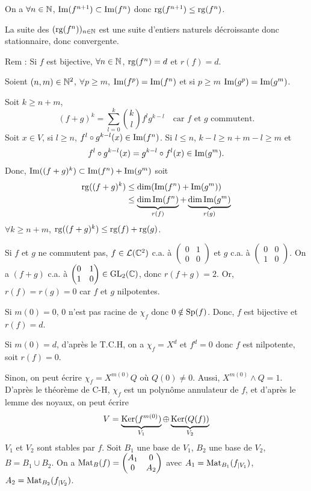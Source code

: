\begin{solution}
On a $\forall n \in \mathbb N$, $\operatorname{Im}(f^{n+1}) \subset \operatorname{Im}(f^n)$
donc $\operatorname{rg}(f^{n+1}) \leq \operatorname{rg}(f^n)$.

La suite des $(\operatorname{rg}(f^n))_{n \in \mathbb N}$ est une suite d'entiers naturels décroissante donc stationnaire, donc convergente.

Rem : Si $f$ est bijective, $\forall n \in \mathbb N$, $\operatorname{rg}(f^n) = d$ et $r(f) = d$.

Soient $(n,m) \in \mathbb N^2$, $\forall p \geq m$, $\operatorname{Im}(f^p) = \operatorname{Im}(f^n)$ et si $p \geq m$ $\operatorname{Im}(g^p) = \operatorname{Im}(g^m)$.

Soit $k \geq n+m$,
\[
(f+g)^k = \sum_{l=0}^k \binom{k}{l} f^l g^{k-l} \quad \text{car } f \text{ et } g \text{ commutent.}
\]
Soit $x \in V$, si $l \geq n$, $f^l \circ g^{k-l}(x) \in \operatorname{Im}(f^n)$.
Si $l \leq n$, $k-l \geq n+m-l \geq m$ et
\[
f^l \circ g^{k-l}(x) = g^{k-l} \circ f^l(x) \in \operatorname{Im}(g^m).
\]
Donc, $\operatorname{Im}((f+g)^k) \subset \operatorname{Im}(f^n) + \operatorname{Im}(g^m)$
soit
\begin{align*}
\operatorname{rg}((f+g)^k) &\leq \dim(\operatorname{Im}(f^n) + \operatorname{Im}(g^m)) \\
&\leq \underbrace{\dim \operatorname{Im}(f^n)}_{r(f)} + \underbrace{\dim \operatorname{Im}(g^m)}_{r(g)}
\end{align*}
$\forall k \geq n+m$, $\operatorname{rg}((f+g)^k) \leq \operatorname{rg}(f) + \operatorname{rg}(g)$.

Si $f$ et $g$ ne commutent pas,
$f \in \mathcal L(\mathbb C^2)$ c.a. à $\begin{pmatrix} 0 & 1 \\ 0 & 0 \end{pmatrix}$ et $g$ c.a. à $\begin{pmatrix} 0 & 0 \\ 1 & 0 \end{pmatrix}$.
On a $(f+g)$ c.a. à $\begin{pmatrix} 0 & 1 \\ 1 & 0 \end{pmatrix} \in \operatorname{GL}_2(\mathbb C)$, donc $r(f+g) = 2$.
Or, $r(f) = r(g) = 0$ car $f$ et $g$ nilpotentes.

Si $m(0) = 0$, $0$ n'est pas racine de $\chi_f$ donc $0 \notin \operatorname{Sp}(f)$.
Donc, $f$ est bijective et $r(f) = d$.

Si $m(0) = d$, d'après le T.C.H, on a $\chi_f = X^d$ et $f^d = 0$ donc $f$ est nilpotente, soit $r(f) = 0$.

Sinon, on peut écrire $\chi_f = X^{m(0)} Q$ où $Q(0) \neq 0$.
Aussi, $X^{m(0)} \land Q = 1$. D'après le théorème de C-H, $\chi_f$ est un polynôme annulateur de $f$, et d'après le lemme des noyaux, on peut écrire
\[
V = \underbrace{\operatorname{Ker}(f^{m(0)})}_{V_1} \oplus \underbrace{\operatorname{Ker}(Q(f))}_{V_2}
\]
$V_1$ et $V_2$ sont stables par $f$.
Soit $B_1$ une base de $V_1$, $B_2$ une base de $V_2$, $B = B_1 \cup B_2$.
On a $\operatorname{Mat}_B(f) = \begin{pmatrix} A_1 & 0 \\ 0 & A_2 \end{pmatrix}$ avec $A_1 = \operatorname{Mat}_{B_1}(f_{|V_1})$, $A_2 = \operatorname{Mat}_{B_2}(f_{|V_2})$.


\end{solution}
